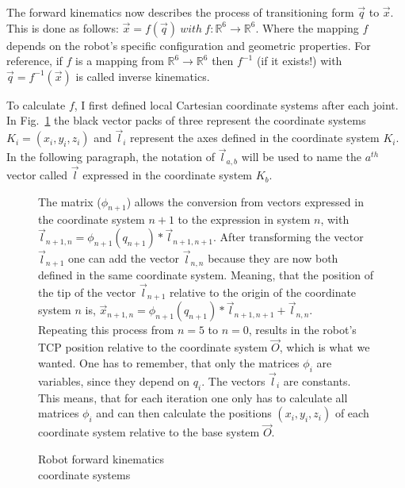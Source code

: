 The forward kinematics now describes the process of transitioning form $ \vec{q} $ to $ \vec{x} $. This is done as follows: $ \vec{x} = f(\vec{q})~with~f: \mathbb{R}^6 \rightarrow \mathbb{R}^6$. Where the mapping $f$ depends on the robot's specific configuration and geometric properties. For reference, if $f$ is a mapping from $\mathbb{R}^6 \rightarrow \mathbb{R}^6$ then $f^{-1}$ (if it exists!) with $ \vec{q} = f^{-1}(\vec{x})$ is called inverse kinematics. 

To calculate $f$, I first defined local Cartesian coordinate systems after each joint. In Fig.~\ref{Fig:ForwardKinematics} the black vector packs of three represent the coordinate systems $K_i = (x_i, y_i, z_i)$ and $\vec{l}_i$ represent the axes defined in the coordinate system $K_i$. In the following paragraph, the notation of  $\vec{l}_{a,b}$ will be used to name the $a^{th}$ vector called $\vec{l}$ expressed in the coordinate system $K_b$.

\begin{figure}[!h]
	\begin{minipage}{0.45\textwidth}
		\centering
		
		\caption{Robot forward kinematics\\coordinate systems}
		\label{Fig:ForwardKinematics}
	\end{minipage}\hfill
	\begin{minipage}{0.45\textwidth}
		The matrix ($\phi_{n+1}$) allows the conversion from vectors expressed in the coordinate system $n + 1$ to the expression in system $n$, with $\vec{l}_{n+1,n} = \phi_{n+1}(q_{n+1}) * \vec{l}_{n+1,n+1}$. After transforming the vector $\vec{l}_{n+1}$ one can add the vector $\vec{l}_{n,n}$ because they are now both defined in the same coordinate system. Meaning, that the position of the tip of the vector $\vec{l}_{n+1}$ relative to the origin of the coordinate system $n$ is, $\vec{x}_{n+1,n} = \phi_{n+1}(q_{n+1}) * \vec{l}_{n+1,n+1} + \vec{l}_{n,n} $.\\
		Repeating this process from $n = 5$ to $n = 0$, results in the robot's TCP position relative to the coordinate system $\vec{O}$, which is what we wanted. One has to remember, that only the matrices $\phi_{i}$ are variables, since they depend on $q_i$. The vectors $\vec{l}_i$ are constants. This means, that for each iteration one only has to calculate all matrices $\phi_i$ and can then calculate the positions $(x_i, y_i, z_i)$ of each coordinate system relative to the base system $\vec{O}$.
	\end{minipage}
\end{figure}

